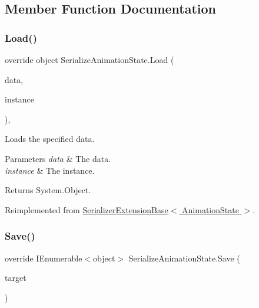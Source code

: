 \subsection{Member Function Documentation}
\mbox{\label{class_serialize_animation_state_a2e05ae356542c8df18779774e5189cee}} 
\subsubsection{\texorpdfstring{Load()}{Load()}}
{\footnotesize\ttfamily override object Serialize\+Animation\+State.\+Load (\begin{DoxyParamCaption}\item[{object \mbox{[}$\,$\mbox{]}}]{data,  }\item[{object}]{instance }\end{DoxyParamCaption})\hspace{0.3cm}{\ttfamily [inline]}, {\ttfamily [virtual]}}



Loads the specified data. 


\begin{DoxyParams}{Parameters}
{\em data} & The data.\\
\hline
{\em instance} & The instance.\\
\hline
\end{DoxyParams}
\begin{DoxyReturn}{Returns}
System.\+Object.
\end{DoxyReturn}


Reimplemented from \hyperlink{class_serializer_extension_base_a3792a9b27056e30ca0ac91531936ae47}{Serializer\+Extension\+Base$<$ Animation\+State $>$}.

\mbox{\label{class_serialize_animation_state_a3c4bec56bc5d5363ebdcc7a85e361bca}} 
\subsubsection{\texorpdfstring{Save()}{Save()}}
{\footnotesize\ttfamily override I\+Enumerable$<$object$>$ Serialize\+Animation\+State.\+Save (\begin{DoxyParamCaption}\item[{Animation\+State}]{target }\end{DoxyParamCaption})\hspace{0.3cm}{\ttfamily [inline]}}



